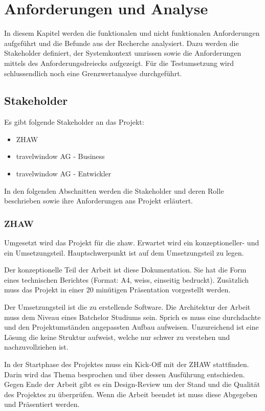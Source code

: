 

\chapter{Anforderungen und Analyse}
\label{sec:analyse}
In diesem Kapitel werden die funktionalen und nicht funktionalen Anforderungen aufgeführt und die Befunde aus der Recherche analysiert. Dazu werden die Stakeholder definiert, der Systemkontext umrissen sowie die Anforderungen mittels des Anforderungsdreiecks aufgezeigt. Für die Testumsetzung wird schlussendlich noch eine Grenzwertanalyse durchgeführt.

\section{Stakeholder}
Es gibt folgende Stakeholder an das Projekt:
\begin{itemize}
\item ZHAW
\item travelwindow AG - Business
\item travelwindow AG - Entwickler
\end{itemize}

In den folgenden Abschnitten werden die Stakeholder und deren Rolle beschrieben sowie ihre Anforderungen ans Projekt erläutert.

\subsection{ZHAW}
Umgesetzt wird das Projekt für die \gls{zhaw}. Erwartet wird ein konzeptioneller- und ein Umsetzungsteil. Hauptschwerpunkt ist auf dem Umsetzungsteil zu legen.

Der konzeptionelle Teil der Arbeit ist diese Dokumentation. Sie hat die Form eines technischen Berichtes (Format: A4, weiss, einseitig bedruckt). Zusätzlich muss das Projekt in einer 20 minütigen Präsentation vorgestellt werden.

Der Umsetzungsteil ist die zu erstellende Software. Die Architektur der Arbeit muss dem Niveau eines Batchelor Studiums sein. Sprich es muss eine durchdachte und den Projektumständen angepassten Aufbau aufweisen. Unzureichend ist eine Lösung die keine Struktur aufweist, welche nur schwer zu verstehen und nachzuvollziehen ist.

In der Startphase des Projektes muss ein Kick-Off mit der ZHAW stattfinden. Darin wird das Thema besprochen und über dessen Ausführung entschieden. Gegen Ende der Arbeit gibt es ein Design-Review um der Stand und die Qualität des Projektes zu überprüfen. Wenn die Arbeit beendet ist muss diese Abgegeben und Präsentiert werden.

